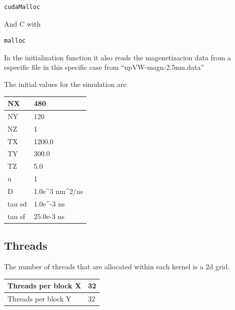 \begin{lstlisting}[frame=none]
cudaMalloc
\end{lstlisting}
And C with

\begin{lstlisting}[frame=none]
malloc
\end{lstlisting}

In the initialization function it also reads the magenetizacion data from a especific file in this specific case from ``upVW-magn-2.5nm.data''


The initial values for the simulation are

\begin{table}[h]
\centering
\begin{tabular}{| l | l |}
\hline   
NX     & 480                                            \\
\hline   
NY     & 120                                            \\
\hline   
NZ     & 1                                              \\
\hline   
TX     & 1200.0                                         \\
\hline   
TY     & 300.0                                          \\
\hline   
TZ     & 5.0                                            \\
\hline   
u      & 1                                              \\
\hline   
D      & 1.0e\textasciicircum 3 nm\textasciicircum 2/ns \\
\hline   
tau sd & 1.0e\textasciicircum -3 ns                     \\
\hline   
tau sf & 25.0e-3 ns      \\
\hline   
\end{tabular}
\end{table}


\subsection{Threads}

The number of threads that are allocated within each kernel is a 2d grid.

\begin{table}[h]
\centering
\begin{tabular}{| l | l |}
\hline   
Threads per block  X   & 32       \\
\hline   
Threads per block Y     & 32         \\
\hline
\end{tabular}
\end{table}

